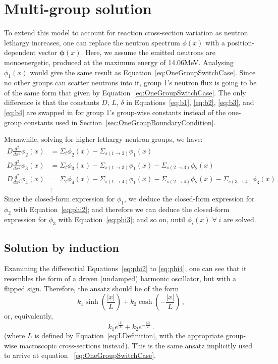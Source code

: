 \documentclass[a4paper, 12pt]{article}
\newcommand{\ve}[1]{\boldsymbol{#1}}
\begin{document}
\section{Multi-group solution}
To extend this model to account for reaction cross-section variation as neutron lethargy increases, one can replace the neutron spectrum $\phi(x)$ with a position-dependent vector $\ve{\phi}(x)$.
Here, we assume the emitted neutrons are monoenergetic, produced at the maximum energy of 14.06MeV.
Analysing $\phi_1(x)$ would give the same result as Equation~\ref{eq:OneGroupSwitchCase}.
Since no other groups can scatter neutrons into it, group 1's neutron flux is going to be of the same form that given by Equation~\ref{eq:OneGroupSwitchCase}. The only difference is that the constants $D$, $L$, $\delta$ in Equations~\ref{eq:b1}, \ref{eq:b2}, \ref{eq:b3}, and \ref{eq:b4} are swapped in for group 1's group-wise constants instead of the one-group constants used in Section~\ref{sec:OneGroupBoundaryCondition}.

Meanwhile, solving for higher lethargy neutron groups, we have:
\begin{align}
    D \frac{d^2}{dx^2}\phi_2(x) &= \Sigma_t \phi_2(x)  - \Sigma_{s(1\rightarrow 2)} \phi_1(x)\label{eq:phi2}\\
    D \frac{d^2}{dx^2}\phi_3(x) &= \Sigma_t \phi_3(x)  - \Sigma_{s(1\rightarrow 3)} \phi_1(x) - \Sigma_{s(2\rightarrow 3)} \phi_2(x)\label{eq:phi3}\\
    D \frac{d^2}{dx^2}\phi_4(x) &= \Sigma_t \phi_4(x)  - \Sigma_{s(1\rightarrow 4)} \phi_1(x) - \Sigma_{s(2\rightarrow 4)} \phi_2(x) - \Sigma_{s(3\rightarrow 4)} \phi_3(x)\label{eq:phi4}\\
    &\vdots \nonumber
\end{align}
Since the closed-form expression for $\phi_1$, we deduce the closed-form expression for $\phi_2$ with Equation~\ref{eq:phi2}; and therefore we can deduce the closed-form expression for $\phi_3$ with Equation~\ref{eq:phi3}; and so on, until $\phi_i(x)\; \forall\; i$  are solved.

\subsection{Solution by induction}
Examining the differential Equations~\ref{eq:phi2} to \ref{eq:phi4}, one can see that it resembles the form of a driven (undamped) harmonic oscillator, but with a flipped sign. Therefore, the ansatz should be of the form $$k_1 \sinh(\frac{|x|}{L}) + k_2 \cosh(-\frac{|x|}{L})\,,$$ or, equivalently, $$k_1 e^{\frac{|x|}{L}} + k_2 e^{-\frac{|x|}{L}}\,.$$
(where $L$ is defined by Equation~\ref{eq:LDefinition}, with the appropriate group-wise macroscopic cross-sections instead). This is the same ansatz implicitly used to arrive at equation ~\ref{eq:OneGroupSwitchCase}.
\end{document}
